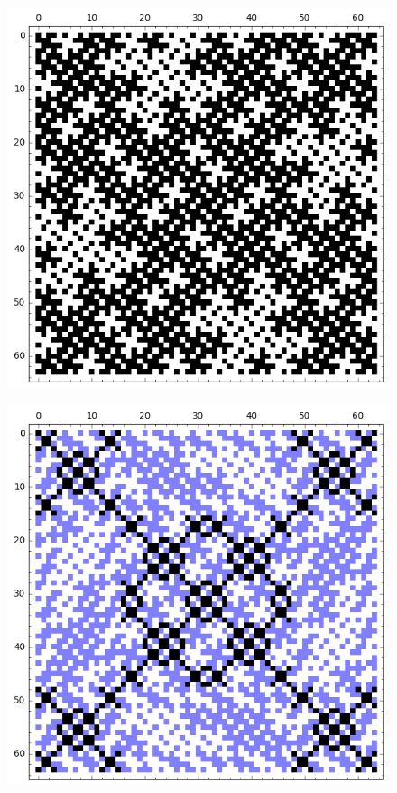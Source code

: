 \documentclass[12pt,a4paper]{article}
\begin{document}
\begin{figure}
\centering
\begin{minipage}{.48\textwidth}
  \centering
  \includegraphics[width=.9\linewidth]{../matrix_plot/sigma_3_bent_cayley_graph_index_matrix.png}
  \label{fig:sigma_3_bent_cayley_graph_index_matrix}
\end{minipage}%
\begin{minipage}{.48\textwidth}
  \centering
  \includegraphics[width=.9\linewidth]{../matrix_plot/tau_3_bent_cayley_graph_index_matrix.png}
  \label{fig:tau_3_bent_cayley_graph_index_matrix}
\end{minipage}
\end{figure}
\end{document}
